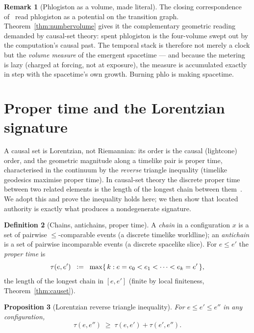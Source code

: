 \documentclass[11pt]{article}
\theoremstyle{definition}
\newtheorem{definition}{Definition}[section]
\newtheorem{remark}[definition]{Remark}
\theoremstyle{plain}
\newtheorem{proposition}[definition]{Proposition}
\newcommand{\propertime}{\tau}
\newcommand{\defeq}{\;\mathrel{\vcentcolon=}\;}
\theoremstyle{remark}
\begin{document}
\begin{remark}[Phlogiston as a volume, made literal]
The closing correspondence of~\cite{CostNote} read phlogiston as a
potential on the transition graph. Theorem~\ref{thm:numbervolume} gives
it the complementary geometric reading demanded by causal-set theory:
spent phlogiston is the four-volume swept out by the computation's causal
past. The temporal stack is therefore not merely a clock but the
\emph{volume measure} of the emergent spacetime --- and because the
metering is lazy (charged at forcing, not at exposure), the measure is
accumulated exactly in step with the spacetime's own growth. Burning
phlo is making spacetime.
\end{remark}

\section{Proper time and the Lorentzian signature}
\label{sec:lorentz}

A causal set is Lorentzian, not Riemannian: its order is the causal
(lightcone) order, and the geometric magnitude along a timelike pair is
proper time, characterised in the continuum by the \emph{reverse}
triangle inequality (timelike geodesics maximise proper time). In
causal-set theory the discrete proper time between two related elements
is the length of the longest chain between them~\cite{SorkinValdivia}.
We adopt this and prove the inequality holds here; we then show that
located authority is exactly what produces a nondegenerate signature.

\begin{definition}[Chains, antichains, proper time]
\label{def:chain}
A \emph{chain} in a configuration $x$ is a set of pairwise
$\le$-comparable events (a discrete timelike worldline); an
\emph{antichain} is a set of pairwise incomparable events (a discrete
spacelike slice). For $e \le e'$ the \emph{proper time} is
\[
  \propertime(e, e') \;\defeq\;
  \max\{\, k : e = e_0 < e_1 < \cdots < e_k = e' \,\},
\]
the length of the longest chain in $[e,e']$ (finite by local finiteness,
Theorem~\ref{thm:causet}).
\end{definition}

\begin{proposition}[Lorentzian reverse triangle inequality]
\label{prop:revtriangle}
For $e \le e' \le e''$ in any configuration,
\[
  \propertime(e, e'') \;\ge\; \propertime(e, e') + \propertime(e', e'').
\]
\end{proposition}
\end{document}
